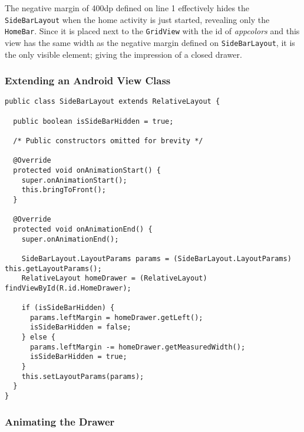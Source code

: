 The negative margin of 400dp defined on line 1 effectively hides the \lstinline|SideBarLayout| when the home activity is just started, revealing only the \lstinline|HomeBar|.
Since it is placed next to the \lstinline|GridView| with the id of \textit{appcolors} and this view has the same width as the negative margin defined on \lstinline|SideBarLayout|, it is the only visible element; giving the impression of a closed drawer.

\subsubsection{Extending an Android View Class}\label{sec:siebarlayout:java}


\begin{lstlisting}[caption={Extending the Android \lstinline|RelativeLayout| class.},label={lst:sidebarlayout:java}]
public class SideBarLayout extends RelativeLayout {
  
  public boolean isSideBarHidden = true;
  
  /* Public constructors omitted for brevity */
  
  @Override
  protected void onAnimationStart() {
    super.onAnimationStart();
    this.bringToFront();
  }
  
  @Override
  protected void onAnimationEnd() {
    super.onAnimationEnd();

    SideBarLayout.LayoutParams params = (SideBarLayout.LayoutParams) this.getLayoutParams();
    RelativeLayout homeDrawer = (RelativeLayout) findViewById(R.id.HomeDrawer);

    if (isSideBarHidden) {
      params.leftMargin = homeDrawer.getLeft();
      isSideBarHidden = false;
    } else {
      params.leftMargin -= homeDrawer.getMeasuredWidth();
      isSideBarHidden = true;
    }
    this.setLayoutParams(params);
  }
}
\end{lstlisting}

\subsubsection{Animating the Drawer}


